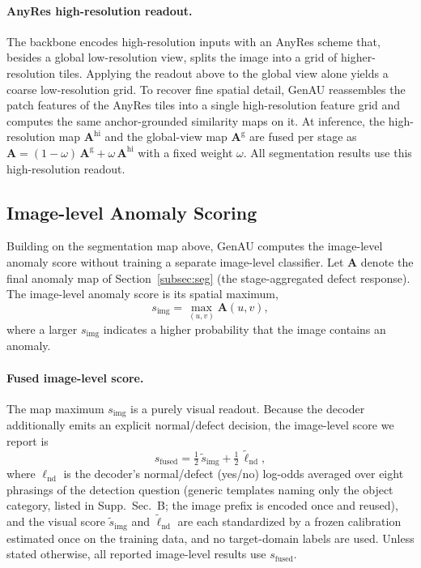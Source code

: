 \paragraph{AnyRes high-resolution readout.}
The backbone encodes high-resolution inputs with an AnyRes scheme that, besides a global low-resolution view, splits the image into a grid of higher-resolution tiles. Applying the readout above to the global view alone yields a coarse low-resolution grid. To recover fine spatial detail, GenAU reassembles the patch features of the AnyRes tiles into a single high-resolution feature grid and computes the same anchor-grounded similarity maps on it. At inference, the high-resolution map $\mathbf{A}^{\mathrm{hi}}$ and the global-view map $\mathbf{A}^{\mathrm{g}}$ are fused per stage as $\mathbf{A}=(1-\omega)\,\mathbf{A}^{\mathrm{g}}+\omega\,\mathbf{A}^{\mathrm{hi}}$ with a fixed weight $\omega$. All segmentation results use this high-resolution readout.

\subsection{Image-level Anomaly Scoring}
\label{subsec:img}
Building on the segmentation map above, GenAU computes the image-level anomaly score without training a separate image-level classifier. Let $\mathbf{A}$ denote the final anomaly map of Section~\ref{subsec:seg} (the stage-aggregated defect response). The image-level anomaly score is its spatial maximum,
\begin{equation}
    s_{\mathrm{img}}
    =
    \max_{(u,v)}\mathbf{A}(u,v),
\end{equation}
where a larger $s_{\mathrm{img}}$ indicates a higher probability that the image contains an anomaly.

\paragraph{Fused image-level score.}
The map maximum $s_{\mathrm{img}}$ is a purely visual readout. Because the decoder additionally emits an explicit normal/defect decision, the image-level score we report is
\begin{equation}
    s_{\mathrm{fused}}
    =
    \tfrac{1}{2}\,\tilde{s}_{\mathrm{img}}
    +
    \tfrac{1}{2}\,\tilde{\ell}_{\mathrm{nd}},
\end{equation}
where $\ell_{\mathrm{nd}}$ is the decoder's normal/defect (yes/no) log-odds averaged over eight phrasings of the detection question (generic templates naming only the object category, listed in Supp.~Sec.~B; the image prefix is encoded once and reused), and the visual score $\tilde{s}_{\mathrm{img}}$ and $\tilde{\ell}_{\mathrm{nd}}$ are each standardized by a frozen calibration estimated once on the training data, and no target-domain labels are used. Unless stated otherwise, all reported image-level results use $s_{\mathrm{fused}}$.



